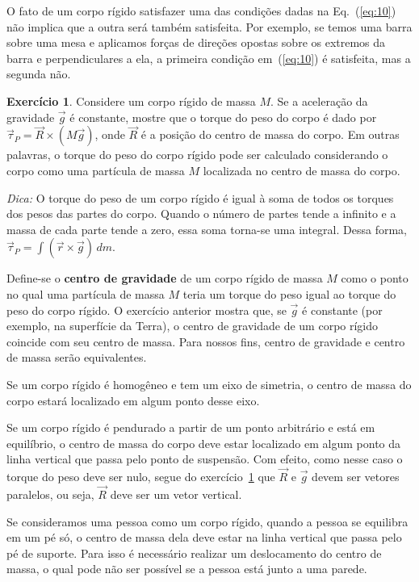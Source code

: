 \documentclass[papersize=a4,DIV=calc,twocolumn=on]{scrartcl}
\theoremstyle{definition}
\newtheorem{ex}{Exercício}[section]
\begin{document}
O fato de um corpo rígido satisfazer uma das condições dadas na
Eq.~(\ref{eq:10}) não implica que a outra será também satisfeita. Por
exemplo, se temos uma barra sobre uma mesa e aplicamos forças de
direções opostas sobre os extremos da barra e perpendiculares a ela, a
primeira condição em~(\ref{eq:10}) é satisfeita, mas a segunda não.

\begin{ex}
  \label{ex:1}
  Considere um corpo rígido de massa $M$. Se a aceleração da gravidade
  $\vec g$ é constante, mostre que o torque do peso do corpo é dado
  por $\vec\tau_P=\vec R\times(M\vec g)$, onde $\vec R$ é a posição do
  centro de massa do corpo. Em outras palavras, o torque do peso do
  corpo rígido pode ser calculado considerando o corpo como uma
  partícula de massa $M$ localizada no centro de massa do corpo.

  \noindent\textit{Dica:} O torque do peso de um corpo rígido é igual
  à soma de todos os torques dos pesos das partes do corpo. Quando o
  número de partes tende a infinito e a massa de cada parte tende a
  zero, essa soma torna-se uma integral. Dessa forma,
  $\vec\tau_P=\int (\vec r\times\vec g)\,dm$.
\end{ex}

Define-se o \textbf{centro de gravidade} de um corpo rígido de massa
$M$ como o ponto no qual uma partícula de massa $M$ teria um torque do
peso igual ao torque do peso do corpo rígido. O exercício anterior
mostra que, se $\vec g$ é constante (por exemplo, na superfície da
Terra), o centro de gravidade de um corpo rígido coincide com seu
centro de massa. Para nossos fins, centro de gravidade e centro de
massa serão equivalentes.

Se um corpo rígido é homogêneo e tem um eixo de simetria, o centro de
massa do corpo estará localizado em algum ponto desse eixo.

Se um corpo rígido é pendurado a partir de um ponto arbitrário e está
em equilíbrio, o centro de massa do corpo deve estar localizado em
algum ponto da linha vertical que passa pelo ponto de suspensão. Com
efeito, como nesse caso o torque do peso deve ser nulo, segue do
exercício~\ref{ex:1} que $\vec R$ e $\vec g$ devem ser vetores
paralelos, ou seja, $\vec R$ deve ser um vetor vertical.

Se consideramos uma pessoa como um corpo rígido, quando a pessoa se
equilibra em um pé só, o centro de massa dela deve estar na linha
vertical que passa pelo pé de suporte. Para isso é necessário realizar
um deslocamento do centro de massa, o qual pode não ser possível se a
pessoa está junto a uma parede.
\end{document}
